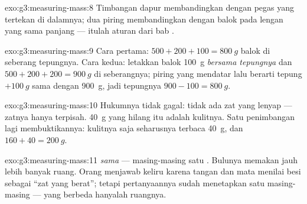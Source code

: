 \begin{solution}{exo:g3:measuring-mass:8}
Timbangan dapur membandingkan dengan pegas yang tertekan di dalamnya;
 dua piring membandingkan dengan balok pada lengan yang sama
panjang --- itulah aturan  dari bab .
\end{solution}

\begin{solution}{exo:g3:measuring-mass:9}
Cara pertama: $500 + 200 + 100 = \qty{800}{g}$ balok di seberang
tepungnya. Cara kedua: letakkan balok \qty{100}{g} \emph{bersama
tepungnya} dan $500 + 200 + 200 = \qty{900}{g}$ di seberangnya; piring
yang mendatar lalu berarti tepung $+ \qty{100}{g}$ sama dengan
\qty{900}{g}, jadi tepungnya $900 - 100 = \qty{800}{g}$.
\end{solution}

\begin{solution}{exo:g3:measuring-mass:10}
Hukumnya tidak gagal: tidak ada zat yang lenyap --- zatnya hanya
terpisah. \qty{40}{g} yang hilang itu adalah kulitnya. Satu
penimbangan lagi membuktikannya: kulitnya saja seharusnya terbaca
\qty{40}{g}, dan $160 + 40 =
\qty{200}{g}$.
\end{solution}

\begin{solution}{exo:g3:measuring-mass:11}
 \emph{sama} --- masing-masing satu . Bulunya memakan
jauh lebih banyak ruang. Orang menjawab keliru karena tangan dan mata
menilai besi sebagai ``zat yang berat''; tetapi pertanyaannya sudah
menetapkan  satu  masing-masing --- yang berbeda
hanyalah ruangnya.
\end{solution}
